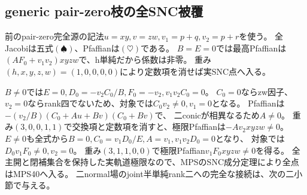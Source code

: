 \documentclass[a4paper,11pt]{ltjsarticle}
\theoremstyle{definition}
\begin{document}
\subsection{generic pair-zero枝の全SNC被覆}
前のpair-zero完全源の記法$u=xy,v=zw,v_1=p+q,v_2=p+r$を使う。
全Jacobiは五式$(\spadesuit)$、Pfaffianは$(\heartsuit)$である。
$B=E=0$では最高Pfaffianは$(AF_0+v_1v_2)xyzw$で、h単純だから係数は非零。
重み$(h,x,y,z,w)=(1,0,0,0,0)$により定数項を消せば実SNC点へ入る。

$B\ne0$では$E=0,D_0=-v_2C_0/B,F_0=-v_2,v_1v_2C_0=0$。
$C_0=0$ならzw因子、$v_2=0$ならrank四でないため、対象では$C_0v_2\ne0,v_1=0$となる。
Pfaffianは$-(v_2/B)(C_0+Au+Bv)(C_0+Bv)$で、
二conicが相異なるため$A\ne0$。
重み$(3,0,0,1,1)$で交換項と定数項を消すと、極限Pfaffianは$-Av_2xyzw\ne0$。
$E\ne0$も全式から$B=0,C_0=v_1D_0/E,A=v_1,v_1v_2D_0=0$となり、
対象では$D_0v_1F_0\ne0,v_2=0$。
重み$(3,1,1,0,0)$で極限Pfaffian$v_1F_0xyzw\ne0$を得る。
全主開と閉補集合を保持した実軌道極限なので、MPSのSNC成分定理により全点はMPS40へ入る。
二normal場のjoint半単純rank二への完全な接続は、次の二小節で与える。
\end{document}
